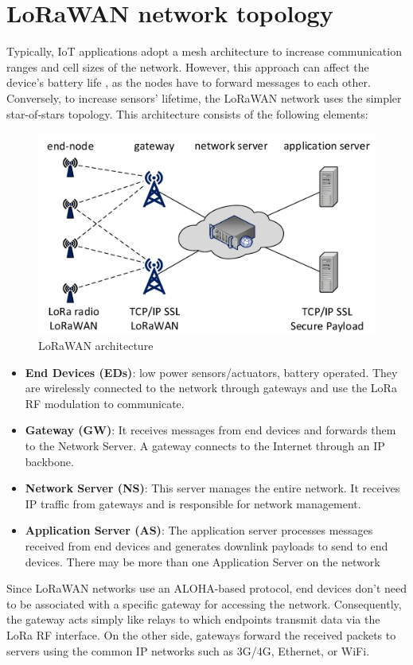 \section{LoRaWAN network topology}
\label{topology}
Typically, IoT applications adopt a mesh architecture to increase communication ranges and cell sizes of the network. However, this approach can affect the device's battery life \cite{article}, as the nodes have to forward messages to each other. Conversely, to increase sensors' lifetime, the LoRaWAN network uses the simpler star-of-stars topology.  This architecture consists of the following elements:
\begin{figure}
    \centering
    \includegraphics[width=0.7\linewidth]{images/lorawan/architecture.png}
    \caption{LoRaWAN architecture}
    \label{fig:architecture}
\end{figure}
\begin{itemize}
	\item \textbf{End Devices (EDs)}: low power sensors/actuators, battery operated. They are wirelessly connected to the network through gateways and use the LoRa RF modulation to communicate.
	\item \textbf{Gateway (GW)}: It receives messages from end devices and forwards them to the Network Server. A gateway connects to the Internet through an IP backbone.
	\item \textbf{Network Server (NS)}: This server manages the entire network. It receives IP traffic from gateways and is responsible for network management.
	\item \textbf{Application Server (AS)}: The application server processes messages received from end devices and generates downlink payloads to send to end devices. There may be more than one Application Server on the network
\end{itemize}
Since LoRaWAN networks use an ALOHA-based protocol, end devices don't need to be associated with a specific gateway for accessing the network. Consequently, the gateway acts simply like relays to which endpoints transmit data via the LoRa RF interface. On the other side, gateways forward the received packets to servers using the common IP networks such as 3G/4G, Ethernet, or WiFi.

